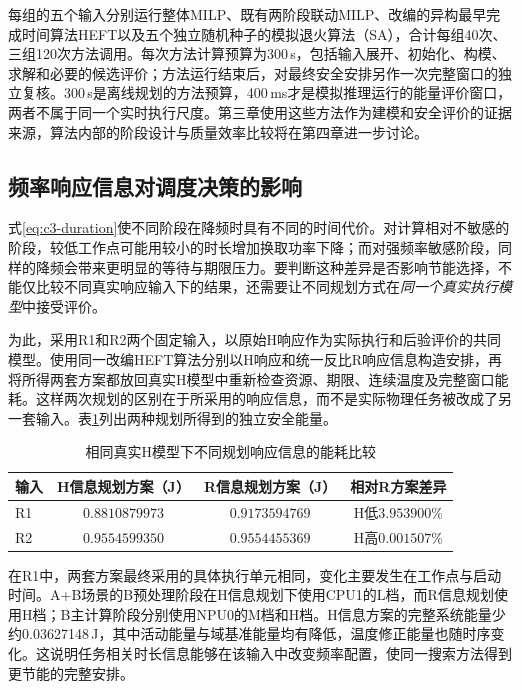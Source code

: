 每组的五个输入分别运行整体MILP、既有两阶段联动MILP、改编的异构最早完成时间算法HEFT以及五个独立随机种子的模拟退火算法（SA），合计每组40次、三组120次方法调用。每次方法计算预算为300\,s，包括输入展开、初始化、构模、求解和必要的候选评价；方法运行结束后，对最终安全安排另作一次完整窗口的独立复核。300\,s是离线规划的方法预算，400\,ms才是模拟推理运行的能量评价窗口，两者不属于同一个实时执行尺度。第三章使用这些方法作为建模和安全评价的证据来源，算法内部的阶段设计与质量效率比较将在第四章进一步讨论。

\subsection{频率响应信息对调度决策的影响}

式\eqref{eq:c3-duration}使不同阶段在降频时具有不同的时间代价。对计算相对不敏感的阶段，较低工作点可能用较小的时长增加换取功率下降；而对强频率敏感阶段，同样的降频会带来更明显的等待与期限压力。要判断这种差异是否影响节能选择，不能仅比较不同真实响应输入下的结果，还需要让不同规划方式在\emph{同一个真实执行模型}中接受评价。

为此，采用R1和R2两个固定输入，以原始H响应作为实际执行和后验评价的共同模型。使用同一改编HEFT算法分别以H响应和统一反比R响应信息构造安排，再将所得两套方案都放回真实H模型中重新检查资源、期限、连续温度及完整窗口能耗。这样两次规划的区别在于所采用的响应信息，而不是实际物理任务被改成了另一套输入。表\ref{tab:c3-response-evidence}列出两种规划所得到的独立安全能量。

\begin{table}[htbp]
 \centering
 \caption{相同真实H模型下不同规划响应信息的能耗比较}
 \label{tab:c3-response-evidence}
 \begin{tabular}{lccc}
 \toprule
 输入 & H信息规划方案（J） & R信息规划方案（J） & 相对R方案差异\\
 \midrule
 R1 & $0.8810879973$ & $0.9173594769$ & H低$3.953900\%$\\
 R2 & $0.9554599350$ & $0.9554455369$ & H高$0.001507\%$\\
 \bottomrule
 \end{tabular}
\end{table}

在R1中，两套方案最终采用的具体执行单元相同，变化主要发生在工作点与启动时间。A+B场景的B预处理阶段在H信息规划下使用CPU1的L档，而R信息规划使用H档；B主计算阶段分别使用NPU0的M档和H档。H信息方案的完整系统能量少约0.03627148\,J，其中活动能量与域基准能量均有降低，温度修正能量也随时序变化。这说明任务相关时长信息能够在该输入中改变频率配置，使同一搜索方法得到更节能的完整安排。

